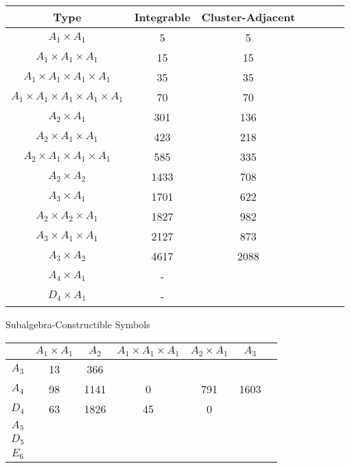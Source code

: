 \documentclass[12pt]{article}
\begin{document}
\begin{center}
\begin{tabular}{ | c | c | c | c | c | c |  c |}
\multicolumn{1}{c}{Type} & \multicolumn{1}{c}{Integrable} & \multicolumn{1}{c}{Cluster-Adjacent} \\
\hline \( A_1 \times A_1 \) & 5 & 5  \\ 
\hline \( A_1 \times A_1 \times A_1 \) & 15 & 15  \\ 
\hline \( A_1 \times A_1 \times A_1 \times A_1 \) & 35 & 35  \\ 
\hline \( A_1 \times A_1 \times A_1 \times A_1 \times A_1 \) & 70 & 70  \\ 
\hline \( A_2 \times A_1 \) & 301 & 136  \\ 
\hline \( A_2 \times A_1 \times A_1 \) & 423 & 218  \\ 
\hline \( A_2 \times A_1 \times A_1 \times A_1 \) & 585 & 335  \\ 
\hline \( A_2 \times A_2 \) & 1433 & 708  \\ 
\hline \( A_3 \times A_1 \) & 1701 & 622  \\ 
\hline \( A_2 \times A_2 \times A_1 \) & 1827 & 982  \\ 
\hline \( A_3 \times A_1 \times A_1 \) & 2127 & 873  \\ 
\hline \( A_3 \times A_2 \) & 4617 & 2088  \\ 
\hline \( A_4 \times A_1 \) & - &  \\ 
\hline \( D_4 \times A_1 \) & - &  \\ 
\hline
\end{tabular}
\vspace{.6cm}


\newpage
Subalgebra-Constructible Symbols

\begin{tabular}{ c ||  c | c | c | c | c |  c |}
 & $A_1 \times A_1$ & $A_2$ & $A_1 \times A_1 \times A_1$ & $A_2 \times A_1$ & $A_3$  \\ \hline
\hline \( A_3 \) &13 & 366 & & &  \\ 
\hline \( A_4 \) & 98 & 1141 & 0 & 791 & 1603 \\ 
\hline \( D_4 \) & 63 & 1826 & 45 & 0 &  \\ 
\hline \( A_5 \) & & & & &  \\ 
\hline \( D_5 \) & & & & &  \\ 
\hline \( E_6 \) & & & & &  \\ 
\hline
\end{tabular}
\vspace{.6cm}


\end{center}
\end{document}
